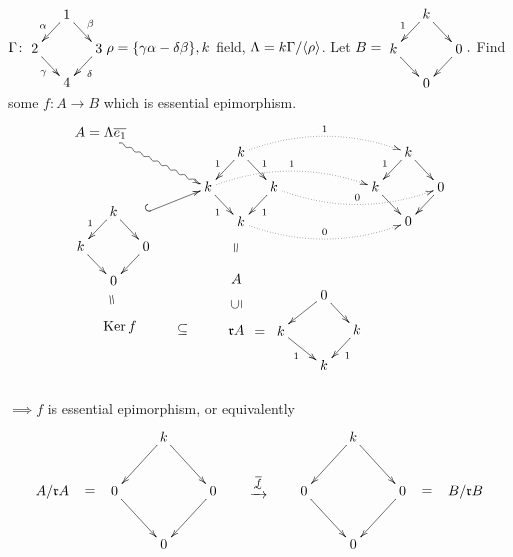 \begin{exam}
$\G \colon 
\vcenter{\xymatrix@C-1pc@R-1pc{
&1\ar[ld]_\alpha \ar[rd]^\beta&\\
2\ar[rd]_\gamma&&3\ar[ld]^\delta\\
&4&
}}
\rho = \{ \gamma\alpha - \delta\beta \}, k$ field, $\Lambda = k\Gamma /
\langle \rho \rangle$. 
Let $B = 
\vcenter{\xymatrix@C-1pc@R-1pc{
&k\ar[ld]_1 \ar[rd]&\\
k\ar[rd] && 0 \ar[ld]\\
&0&
}}.$ 
Find some $f\colon A \to B$ which is essential epimorphism.\\

\[
\xy
\POS(15,5)
\xymatrix"A"@C-1pc@R-1pc{
A=\Lambda \overline{e_1}
}
\POS(42,0)
\xymatrix"Adi"{
&k\ar[ld]_1 \ar[rd]^1&\\
\ar@{<~}["A"u] k\ar[rd]_1 && k \ar[ld]^1\\
&k&
}

\POS(84,0)

\xymatrix"Bdi"{
&k\ar[ld]_1 \ar[rd] \ar@/_1pc/@{<.}["Adi"]_1&\\
\ar@/_1pc/@{<.}["Adi"]_1 k\ar[rd] && 0 \ar[ld] \ar@/^1pc/@{<.}["Adi"]_0\\
&0 \ar@/^1pc/@{<.}["Adi"]_0&
}

\POS(10, -15)
\xymatrix"kerf"{
&k\ar[ld]_1 \ar[rd]& \ar@{^{(}->}["Adi"dll]\\
 k\ar[rd] && 0 \ar[ld]\\
&0&
}

\POS(45, -32)
\xymatrix"rA"@C-1pc@R2pc{
& A\ar@{}["Adi"dd]|-*[@]{=} & \\
 & \mathfrak{r}A \ar@{}[u]|-*[@]{\subseteq} & \\
&&
}

\POS(22, -36)
\xymatrix"ker"@C-1pc@-1pc{
& & \\
 & \Ker f\ar@{}["rA"]|-*[@]{\subseteq} \ar@{}["kerf"d]|-*[@]{=} & \\
&&
}

\POS(60, -36)
\xymatrix"rAdi"@C1pc{
&0\ar[ld] \ar[rd]& \\
 *+[l]{=\;\; k}\ar[rd]_1 && k \ar[ld]^1\\
&k&
}

\endxy
\]

$\implies f$ is essential epimorphism, or equivalently 
\[
\xymatrix{
                                     &           &k\ar[dr]\ar[dl]&                                                &&           &k\ar[dr]\ar[dl]\\
A / \mathfrak{r}A \ar@{}[r]|-*[@]{=} & 0 \ar[dr] && 0 \ar[dl]  \ar@{}[rr]|-*[@]{\xrightarrow{\sim}}^{\overline{f}} &&  0 \ar[dr] && 0 \ar[dl] \ar@{}[r]|-*[@]{=} & B / \mathfrak{r}B\\
                                     &           &0&                                                &&           &0\\
}
\]

\end{exam}

